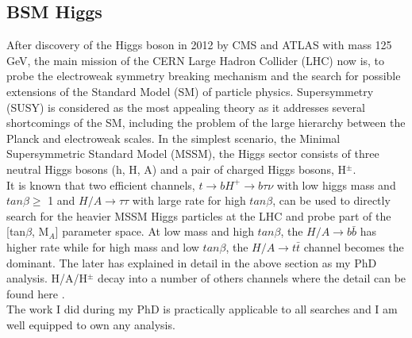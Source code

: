 \documentclass[12pt]{article}
\begin{document}
\subsection*{BSM Higgs}
After discovery of the Higgs boson in 2012 by CMS and ATLAS with mass 125 GeV, the main mission of the CERN Large Hadron Collider (LHC) now is, to probe the electroweak symmetry breaking mechanism and the search for possible extensions of the Standard Model (SM) of particle physics. Supersymmetry (SUSY) is considered as the most appealing theory as it addresses several shortcomings of the SM, including the problem of the large hierarchy between the Planck and electroweak scales. In the simplest scenario, the Minimal Supersymmetric Standard Model (MSSM), the Higgs sector consists of three neutral Higgs bosons (h, H, A) and a pair of charged Higgs bosons, H$^{\pm}$.\\
It is known that two efficient channels, $t\rightarrow bH^{+}\rightarrow b\tau\nu$ with low higgs mass and $tan\beta \geq$ 1 and $H/A\rightarrow\tau\tau$ with large rate for high $tan\beta$, can be used to directly search for the heavier MSSM Higgs particles at the LHC and probe part of the [tan$\beta$, M$_{A}$] parameter space. At low mass and high $tan\beta$, the $H/A\rightarrow b\bar b$ has higher rate while for high mass and low $tan\beta$, the $H/A\rightarrow t\bar t$ channel becomes the dominant. The later has explained in detail in the above section as my PhD analysis. H/A/H$^{\pm}$ decay into a number of others channels where the detail can be found here \cite{third3}. \\
The work I did during my PhD is practically applicable to all searches and I am well equipped to own any analysis.  
\end{document}
